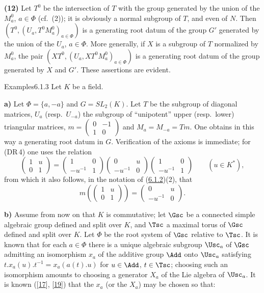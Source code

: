 \documentclass[12pt,a4paper,oneside,english]{smfart}
\makeatletter
\newcommand{\btanchor}[1]{\leavevmode\Hy@raisedlink{\hypertarget{bt:#1}{}}}
\newcommand{\btref}[1]{\hyperlink{bt:#1}{#1}}
\newcommand{\btbib}[1]{\hyperlink{bib:#1}{#1}}
\theoremstyle{definition}
\theoremstyle{bt}
\makeatother
\begin{document}
\medskip
\noindent\textbf{(12)} Let $T^{0}$ be the intersection of $T$ with the group
generated by the union of the $M_a^{0}$, $a\in\Phi$ (cf.\ (2)); it is obviously a
normal subgroup of $T$, and even of $N$. Then
$(T^{0},(U_a,T^{0}M_a^{0})_{a\in\Phi})$ is a generating root datum of the group
$G'$ generated by the union of the $U_a$, $a\in\Phi$. More generally, if $X$ is a
subgroup of $T$ normalized by $M_a^{0}$, the pair
$(XT^{0},(U_a,XT^{0}M_a^{0})_{a\in\Phi})$ is a generating root datum of the group
generated by $X$ and $G'$. These assertions are evident.

\begin{stmt}{Examples}{6.1.3}\btanchor{6.1.3}
Let $K$ be a field.
\end{stmt}

\noindent\textbf{a)} Let $\Phi=\{a,-a\}$ and $G=SL_2(K)$. Let $T$ be the subgroup
of diagonal matrices, $U_a$ (resp.\ $U_{-a}$) the subgroup of ``unipotent'' upper
(resp.\ lower) triangular matrices,
$m=\begin{pmatrix}0&-1\\1&0\end{pmatrix}$ and $M_a=M_{-a}=Tm$. One obtains in
this way a generating root datum in $G$. Verification of the axioms is immediate;
for (DR\,4) one uses the relation
\begin{equation}
\begin{pmatrix}1&u\\0&1\end{pmatrix}
=\begin{pmatrix}1&0\\-u^{-1}&1\end{pmatrix}
 \begin{pmatrix}0&u\\-u^{-1}&0\end{pmatrix}
 \begin{pmatrix}1&0\\-u^{-1}&1\end{pmatrix}\qquad(u\in K^{*}),
\end{equation}
from which it also follows, in the notation of (\btref{6.1.2})(2), that
\[ m\!\left(\begin{pmatrix}1&u\\0&1\end{pmatrix}\right)
   =\begin{pmatrix}0&u\\-u^{-1}&0\end{pmatrix}. \]

\medskip
\noindent\textbf{b)} Assume from now on that $K$ is commutative; let $\Gsc$ be a
connected simple algebraic group defined and split over $K$, and $\Tsc$ a maximal
torus of $\Gsc$ defined and split over $K$. Let $\Phi$ be the root system of
$\Gsc$ relative to $\Tsc$. It is known that for each $a\in\Phi$ there is a unique
algebraic subgroup $\Usc_a$ of $\Gsc$ admitting an isomorphism $x_a$ of the
additive group $\Add$ onto $\Usc_a$ satisfying
$t.x_a(u).t^{-1}=x_a(a(t).u)$ for $u\in\Add$, $t\in\Tsc$; choosing such an
isomorphism amounts to choosing a generator $X_a$ of the Lie algebra of $\Usc_a$.
It is known ([\btbib{17}], [\btbib{19}]) that the $x_a$ (or the $X_a$) may be chosen so that:
\end{document}
